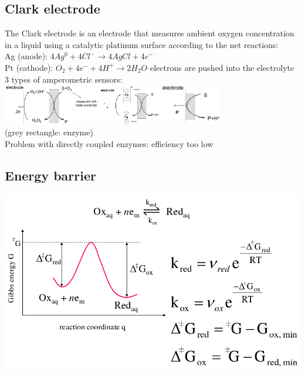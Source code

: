 \documentclass[9pt]{article}
\begin{document}
\begin{multicols}{2}
\subsection{Clark electrode}
The Clark electrode is an electrode that measures ambient oxygen concentration in a liquid using a catalytic platinum surface according to the net reactions:\\
Ag (anode): $4Ag^0+4Cl^- \rightarrow 4AgCl+4e^-$ \\
Pt (cathode): $O_2+4e^-+4H^+ \rightarrow 2H_2O$ electrons are pushed into the electrolyte\\
3 types of amperometric sensors:\\
\includegraphics[height=50pt]{Images/O2_based_sensor.png}
\includegraphics[height=50pt]{Images/mediator_based_sensor.png}
\includegraphics[height=50pt]{Images/Directly-Coupled_Enzymes.png}\\
 (grey rectangle: enzyme)\\
 Problem with directly coupled enzymes: efficiency too low
 \subsection{Energy barrier}
	\includegraphics[width=0.8\linewidth]{Images/energy_barrier.png}
		

\end{multicols}
\end{document}
